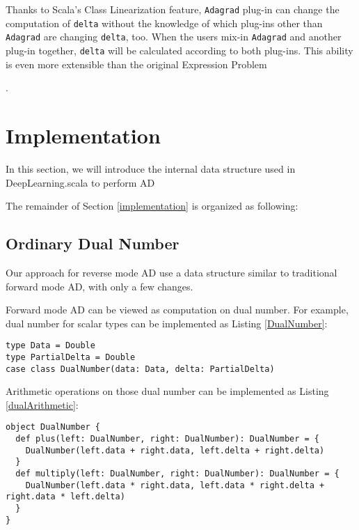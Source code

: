 Thanks to Scala's Class Linearization \cite{odersky2017scala} feature, \lstinline{Adagrad} \gls{plug-in} can change the computation of \lstinline{delta} without the knowledge of which \glspl{plug-in} other than \lstinline{Adagrad} are changing \lstinline{delta}, too. When the users mix-in \lstinline{Adagrad} and another plug-in together, \lstinline{delta} will be calculated according to both plug-ins. This ability is even more extensible than the original Expression Problem\begin{anonsuppress} \cite{yang2017expression}
\end{anonsuppress}
.

\section{Implementation\label{implementation}}

In this section, we will introduce the internal data structure used in DeepLearning.scala to perform AD

The remainder of Section \ref{implementation} is organized as following:

\subsection{Ordinary Dual Number}

Our approach for reverse mode AD use a data structure similar to traditional forward mode AD, with only a few changes.

Forward mode AD can be viewed as computation on dual number. For example, dual number for scalar types can be implemented as Listing \ref{DualNumber}:

\begin{lstlisting}[float={htbp},caption={Dual number for forward mode AD}, label={DualNumber}]
type Data = Double
type PartialDelta = Double
case class DualNumber(data: Data, delta: PartialDelta)
\end{lstlisting}

Arithmetic operations on those dual number can be implemented as Listing \ref{dualArithmetic}:

\begin{lstlisting}[float={htbp},caption={Arithmetic operations on dual number}, label={dualArithmetic}]
object DualNumber {
  def plus(left: DualNumber, right: DualNumber): DualNumber = {
    DualNumber(left.data + right.data, left.delta + right.delta)
  }
  def multiply(left: DualNumber, right: DualNumber): DualNumber = {
    DualNumber(left.data * right.data, left.data * right.delta + right.data * left.delta)
  }
}
\end{lstlisting}

